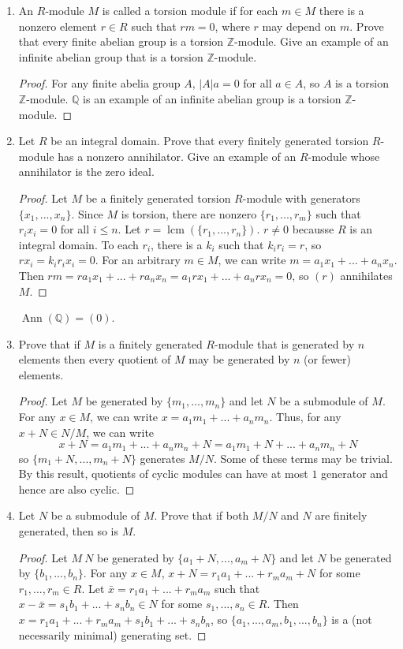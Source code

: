 \documentclass{report}
\newcommand{\Z}{\mathbb{Z}}
\newcommand{\Q}{\mathbb{Q}}
\newcommand{\R}{\mathbb{R}}
\DeclareMathOperator{\An}{Ann}
\DeclareMathOperator{\lcm}{lcm}
\begin{document}
\begin{enumerate}
\begin{proof}
			In the case of 10.1.19, $T:V\to V$ is projection onto the $y$-axis. Then $V=\R^2=\R[T](1,1)$ because $T(1,1)=(0,1)$.
		\end{proof}
	\item An $R$-module $M$ is called a torsion module if for each $m\in M$ there is a nonzero element $r\in R$ such that $rm= 0$, where $r$ may depend on $m$.
		Prove that every finite abelian group is a torsion $\Z$-module. Give an example of an infinite abelian group that is a torsion $\Z$-module.
		\begin{proof}
			For any finite abelia group $A$, $|A|a=0$ for all $a\in A$, so $A$ is a torsion $\Z$-module.
			$\Q$ is an example of an infinite abelian group is a torsion $\Z$-module. 
		\end{proof}
	\item Let $R$ be an integral domain. Prove that every finitely generated torsion $R$-module has a nonzero annihilator.
		Give an example of an $R$-module whose annihilator is the zero ideal.
		\begin{proof}
			Let $M$ be a finitely generated torsion $R$-module with generators $\{x_1,...,x_n\}$. Since $M$ is torsion, there are nonzero $\{r_1,...,r_m\}$ such that $r_ix_i=0$ for all $i\leq n$.
			Let $r=\lcm(\{r_1,...,r_n\})$. $r\neq 0$ becausse $R$ is an integral domain. To each $r_i$, there is a $k_i$ such that $k_ir_i=r$, so $rx_i=k_ir_ix_i=0$.
			For an arbitrary $m\in M$, we can write $m=a_1x_1+...+a_nx_n$. Then $rm=ra_1x_1+...+ r a_nx_n=a_1rx_1+...+a_nrx_n=0$, so $(r)$ annihilates $M$.
		\end{proof}
		$\An(\Q)=(0)$.
	\item Prove that if $M$ is a finitely generated $R$-module that is generated by $n$ elements then every quotient of $M$ may be generated by $n$ (or fewer) elements.
		\begin{proof}
			Let $M$ be generated by $\{m_1,...,m_n\}$ and let $N$ be a submodule of $M$. For any $x\in M$, we can write $x=a_1m_1+...+a_nm_n$.
			Thus, for any $x+N \in N / M$, we can write
			$$x+ N = a_1m_1+...+a_nm_n + N = a_1m_1 + N + ... + a_nm_n + N$$
			so $\{m_1+N,...,m_n+N\}$ generates $M / N$. Some of these terms may be trivial.
			By this result, quotients of cyclic modules can have at most $1$ generator and hence are also cyclic.
		\end{proof}
	\item Let $N$ be a submodule of $M$. Prove that if both $M / N$ and $N$ are finitely generated, then so is $M$.
		\begin{proof}
			Let $M \ N$ be generated by $\{a_1+N,...,a_m+N\}$ and let $N$ be generated by $\{b_1,...,b_n\}$.
			For any $x\in M$, $x+N=r_1a_1+...+r_ma_m + N$ for some $r_1,...,r_m\in R$.
			Let $\bar{x}=r_1a_1+...+r_ma_m$ such that $x - \bar{x}=s_1b_1+...+s_nb_n\in N$ for some $s_1,...,s_n \in R$. 
			Then $x=r_1a_1+...+r_ma_m+s_1b_1+...+s_nb_n$, so $\{a_1,...,a_m,b_1,...,b_n\}$ is a (not necessarily minimal) generating set.
		\end{proof}
		

\end{enumerate}
\end{document}
